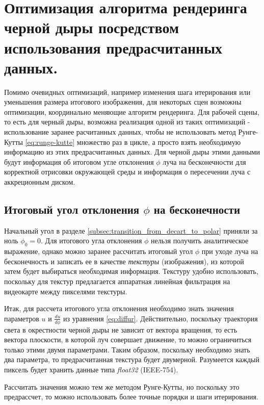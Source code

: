 \section{Оптимизация алгоритма рендеринга черной дыры посредством использования предрасчитанных данных.}
\label{sec:Chapter2} 

Помимо очевидных оптимизаций, например изменения шага итерирования или уменьшения размера итогового изображения, для некоторых сцен возможны оптимизации, координально меняющие алгоритм рендеринга. Для рабочей сцены, то есть для черный дыры, возможна реализация одной из таких оптимизаций - использование заранее расчитанных данных, чтобы не использовать метод Рунге-Кутты \eqref{eq:runge-kutte} множество раз в цикле, а просто взять необходимую информацию из этих предрасчитанных данных. Для черной дыры этими данными будут информация об итоговом угле отклонения $\phi$ луча на бесконечности для корректной отрисовки окружающей среды и информация о пересечении луча с аккреционным диском.

\subsection{Итоговый угол отклонения $\phi$ на бесконечности}
\label{subsec:precomputed_phi}

Начальный угол в разделе \ref{subsec:transition_from_decart_to_polar} приняли за ноль $\phi_{0} = 0$. Для итогового угла отклонения $\phi$ нельзя получить аналитическое выражение, однако можно заранее рассчитать итоговый угол $\phi$ при уходе луча на бесконечность и записать ее в качестве \textit{текстуры} (изображения), из которой затем будет выбираться необходимая информация. Текстуру удобно использовать, поскольку для текстур предлагается аппаратная линейная фильтрация на видеокарте между пикселями текстуры.

Итак, для рассчета итогового угла отклонения необходимо знать значения параметров $u$ и $\frac{du}{d\phi}$ из уравнения \eqref{eq:diffur}. Действительно, поскольку траектория света в окрестности черной дыры не зависит от вектора вращения, то есть вектора плоскости, в которой луч совершает движение, то можно ограничиться только этими двумя параметрами. Таким образом, поскольку необходимо знать два параметра, то предрасчитанная текстура будет двумерной. Разумеется каждый пиксель будет хранить данные типа \textit{float32} (IEEE-754).

Рассчитать значения можно тем же методом Рунге-Кутты, но поскольку это предрассчет, то можно использовать более точные порядки и шаги итерирования.

